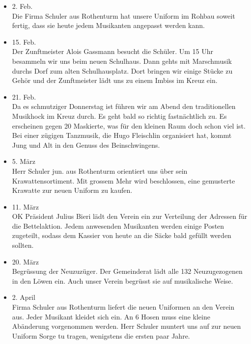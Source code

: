 \begin{history}
\begin{itemize}
        \item[]2. Feb.\\
        Die Firma Schuler aus Rothenturm hat unsere Uniform im Rohbau soweit
        fertig, dass sie heute jedem Musikanten angepasst werden kann.

        \item[]15. Feb.\\
        Der Zunftmeister Alois Gassmann besucht die Schüler. Um 15 Uhr besammeln
        wir uns beim neuen Schulhaus. Dann gehts mit Marschmusik durchs Dorf zum
        alten Schulhausplatz. Dort bringen wir einige Stücke zu Gehör und der
        Zunftmeister lädt uns zu einem Imbiss im Kreuz ein.

        \item[]21. Feb.\\
        Da es schmutziger Donnerstag ist führen wir am Abend den traditionellen
        Musikhock im Kreuz durch. Es geht bald so richtig fastnächtlich zu. Es
        erscheinen gegen 20 Maskierte, was für den kleinen Raum doch schon viel
        ist. Bei einer zügigen Tanzmusik, die Hugo Fleischlin organisiert hat,
        kommt Jung und Alt in den Genuss des Beinschwingens.

        \item[]5. März\\
        Herr Schuler jun. aus Rothenturm orientiert uns über sein
        Krawattensortiment. Mit grossem Mehr wird beschlossen, eine gemusterte
        Krawatte zur neuen Uniform zu kaufen.

        \item[]11. März\\
        OK Präsident Julius Bieri lädt den Verein ein zur Verteilung der
        Adressen für die Bettelaktion. Jedem anwesenden Musikanten werden einige
        Posten zugeteilt, sodass dem Kassier von heute an die Säcke bald gefüllt
        werden sollten.

        \item[]20. März\\
        Begrüssung der Neuzuzüger. Der Gemeinderat lädt alle 132 Neuzugezogenen
        in den Löwen ein. Auch unser Verein begrüsst sie auf musikalische Weise.

        \item[]2. April\\
        Firma Schuler aus Rothenturm liefert die neuen Uniformen an den Verein
        aus. Jeder Musikant kleidet sich ein. An 6 Hosen muss eine kleine
        Abänderung vorgenommen werden. Herr Schuler muntert uns auf zur neuen
        Uniform Sorge tu tragen, wenigstens die ersten paar Jahre.


\end{itemize}
\end{history}
